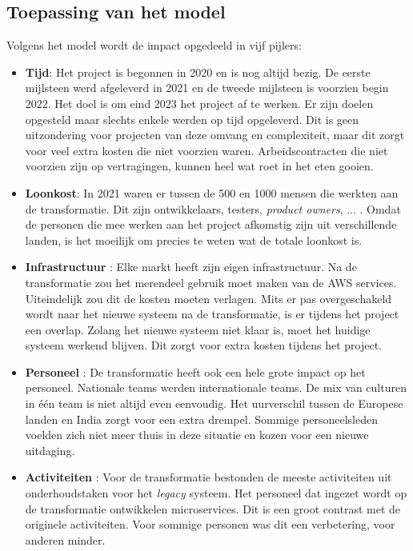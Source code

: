 \subsection{Toepassing van het model}

Volgens het model wordt de impact opgedeeld in vijf pijlers:

\begin{itemize}
    \item \textbf{Tijd}: Het project is begonnen in 2020 en is nog altijd bezig. De eerste mijlsteen werd afgeleverd in 2021 en de tweede mijlsteen is voorzien begin 2022. Het doel is om eind 2023 het project af te werken. Er zijn doelen opgesteld maar slechts enkele werden op tijd opgeleverd. Dit is geen uitzondering voor projecten van deze omvang en complexiteit, maar dit zorgt voor veel extra kosten die niet voorzien waren. Arbeidscontracten die niet voorzien zijn op vertragingen, kunnen heel wat roet in het eten gooien. 
    \item \textbf{Loonkost}: In 2021 waren er tussen de 500 en 1000 mensen die werkten aan de transformatie. Dit zijn ontwikkelaars, testers, \emph{product owners}, ... . Omdat de personen die mee werken aan het project afkomstig zijn uit verschillende landen, is het moeilijk om precies te weten wat de totale loonkost is. 
    \item \textbf{Infrastructuur} : Elke markt heeft zijn eigen infrastructuur. Na de transformatie zou het merendeel gebruik moet maken van de AWS services. Uiteindelijk zou dit de kosten moeten verlagen. Mits er pas overgeschakeld wordt naar het nieuwe systeem na de transformatie, is er tijdens het project een overlap. Zolang het nieuwe systeem niet klaar is, moet het huidige systeem werkend blijven. Dit zorgt voor extra kosten tijdens het project.
    \item \textbf{Personeel} : De transformatie heeft ook een hele grote impact op het personeel. Nationale teams werden internationale teams. De mix van culturen in één team is niet altijd even eenvoudig. Het uurverschil tussen de Europese landen en India zorgt voor een extra drempel. Sommige personeelsleden voelden zich niet meer thuis in deze situatie en kozen voor een nieuwe uitdaging. 
    \item \textbf{Activiteiten} : Voor de transformatie bestonden de meeste activiteiten uit onderhoudstaken voor het \emph{legacy} systeem. Het personeel dat ingezet wordt op de transformatie ontwikkelen microservices. Dit is een groot contrast met de originele activiteiten. Voor sommige personen was dit een verbetering, voor anderen minder.
    
\end{itemize}


